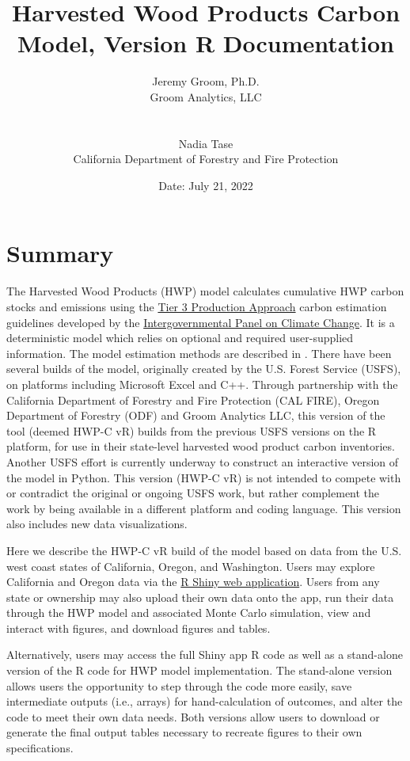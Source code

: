 \documentclass[
  openany]{book}
\title{Harvested Wood Products Carbon Model, Version R Documentation}
\author{Jeremy Groom, Ph.D.\\
Groom Analytics, LLC\\
\strut \\
Nadia Tase\\
California Department of Forestry and Fire Protection}
\date{Date: July 21, 2022}
\begin{document}
\maketitle

{
\setcounter{tocdepth}{1}
\tableofcontents
}
\hypertarget{sum}{%
\chapter{Summary}\label{sum}}

The Harvested Wood Products (HWP) model calculates cumulative HWP carbon stocks and emissions using the \href{https://www.ipcc-nggip.iges.or.jp/public/2006gl/pdf/4_Volume4/V4_04_Ch4_Forest_Land.pdf}{Tier 3 Production Approach} carbon estimation guidelines developed by the \href{https://www.ipcc.ch/}{Intergovernmental Panel on Climate Change}. It is a deterministic model which relies on optional and required user-supplied information. The model estimation methods are described in \textcite{stockmann2012}. There have been several builds of the model, originally created by the U.S. Forest Service (USFS), on platforms including Microsoft Excel and C++. Through partnership with the California Department of Forestry and Fire Protection (CAL FIRE), Oregon Department of Forestry (ODF) and Groom Analytics LLC, this version of the tool (deemed HWP-C vR) builds from the previous USFS versions on the R \autocite{R-base} platform, for use in their state-level harvested wood product carbon inventories. Another USFS effort is currently underway to construct an interactive version of the model in Python. This version (HWP-C vR) is not intended to compete with or contradict the original or ongoing USFS work, but rather complement the work by being available in a different platform and coding language. This version also includes new data visualizations.

Here we describe the HWP-C vR build of the model based on data from the U.S. west coast states of California, Oregon, and Washington. Users may explore California and Oregon data via the \href{https://groomanalyticsllc.shinyapps.io/HWP-C-vR/}{R Shiny web application}. Users from any state or ownership may also upload their own data onto the app, run their data through the HWP model and associated Monte Carlo simulation, view and interact with figures, and download figures and tables.

Alternatively, users may access the full Shiny app R code as well as a stand-alone version of the R code for HWP model implementation. The stand-alone version allows users the opportunity to step through the code more easily, save intermediate outputs (i.e., arrays) for hand-calculation of outcomes, and alter the code to meet their own data needs. Both versions allow users to download or generate the final output tables necessary to recreate figures to their own specifications.
\end{document}
